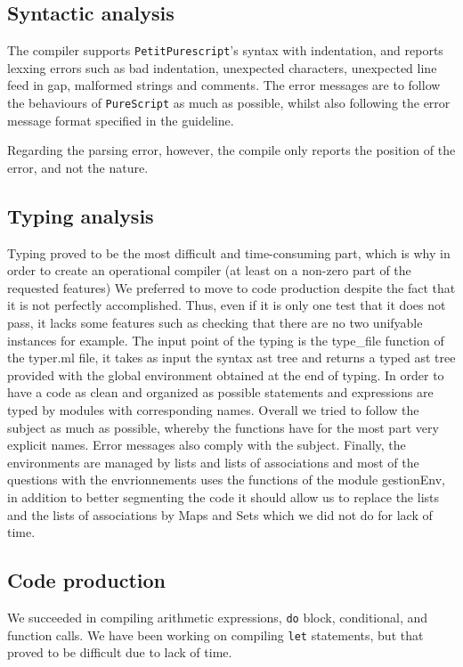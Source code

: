 \documentclass{amsart}
\begin{document}
	\subsection{Syntactic analysis}
	
	The compiler supports \texttt{PetitPurescript}'s syntax with indentation, and reports lexxing errors such as bad indentation, unexpected characters, unexpected line feed in gap, malformed strings and comments. The error messages are to follow the behaviours of \texttt{PureScript} as much as possible, whilst also following the error message format specified in the guideline.
	
	Regarding the parsing error, however, the compile only reports the position of the error, and not the nature.
	
	\subsection{Typing analysis}
	Typing proved to be the most difficult and time-consuming part, which is why in order to create an operational compiler (at least on a non-zero part of the requested features) We preferred to move to code production despite the fact that it is not perfectly accomplished. Thus, even if it is only one test that it does not pass, it lacks some features such as checking that there are no two unifyable instances for example. The input point of the typing is the type\_file function of the typer.ml file, it takes as input the syntax ast tree and returns a typed ast tree provided with the global environment obtained at the end of typing. In order to have a code as clean and organized as possible statements and expressions are typed by modules with corresponding names. Overall we tried to follow the subject as much as possible, whereby the functions have for the most part very explicit names. Error messages also comply with the subject. Finally, the environments are managed by lists and lists of associations and most of the questions with the envrionnements uses the functions of the module gestionEnv, in addition to better segmenting the code it should allow us to replace the lists and the lists of associations by Maps and Sets which we did not do for lack of time.	
	
	\subsection{Code production}
	We succeeded in compiling arithmetic expressions, \texttt{do} block, conditional, and function calls. We have been working on compiling \texttt{let} statements, but that proved to be difficult due to lack of time.
	
\end{document}
